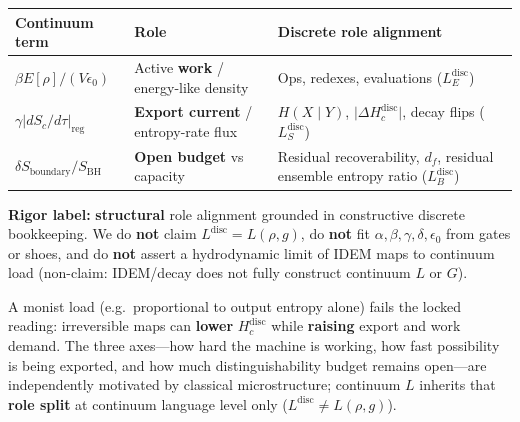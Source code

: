 \documentclass[
  11pt,
]{article}
\newcounter{none} %
\begin{document}
{\def\LTcaptype{none} %
\begin{longtable}[]{@{}
  >{\raggedright\arraybackslash}p{}
  >{\raggedright\arraybackslash}p{}
  >{\raggedright\arraybackslash}p{}@{}}
\toprule\noalign{}
\begin{minipage}[b]{\linewidth}\raggedright
Continuum term
\end{minipage} & \begin{minipage}[b]{\linewidth}\raggedright
Role
\end{minipage} & \begin{minipage}[b]{\linewidth}\raggedright
Discrete role alignment
\end{minipage} \\
\midrule\noalign{}
\endhead
\bottomrule\noalign{}
\endlastfoot
\(\beta E[\rho]/(V\epsilon_0)\) & Active \textbf{work} / energy-like
density & Ops, redexes, evaluations (\(L_E^{\mathrm{disc}}\)) \\
\(\gamma\lvert dS_c/d\tau\rvert_{\mathrm{reg}}\) & \textbf{Export
current} / entropy-rate flux & \(H(X\mid Y)\),
\(\lvert\Delta H_c^{\mathrm{disc}}\rvert\), decay flips
(\(L_S^{\mathrm{disc}}\)) \\
\(\delta S_{\mathrm{boundary}}/S_{\mathrm{BH}}\) & \textbf{Open budget}
vs capacity & Residual recoverability, \(d_f\), residual ensemble
entropy ratio (\(L_B^{\mathrm{disc}}\)) \\
\end{longtable}
}

\textbf{Rigor label:} \textbf{structural} role alignment grounded in
constructive discrete bookkeeping. We do \textbf{not} claim
\(L^{\mathrm{disc}}=L(\rho,g)\), do \textbf{not} fit
\(\alpha,\beta,\gamma,\delta,\epsilon_0\) from gates or shoes, and do
\textbf{not} assert a hydrodynamic limit of IDEM maps to continuum load
(non-claim: IDEM/decay does not fully construct continuum \(L\) or
\(G\)).

A monist load (e.g.~proportional to output entropy alone) fails the
locked reading: irreversible maps can \textbf{lower}
\(H_c^{\mathrm{disc}}\) while \textbf{raising} export and work demand.
The three axes---how hard the machine is working, how fast possibility
is being exported, and how much distinguishability budget remains
open---are independently motivated by classical microstructure;
continuum \(L\) inherits that \textbf{role split} at continuum language
level only (\(L^{\mathrm{disc}}\neq L(\rho,g)\)).
\end{document}
